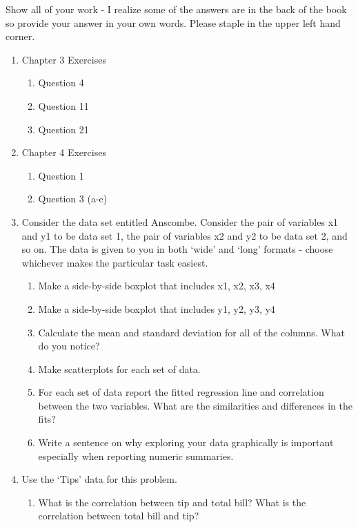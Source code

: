 \documentclass[10pt]{article}
\begin{document}
\pagestyle{fancy}
Show all of your work - I realize some of the answers are in the back of the book so provide your answer in your own words. Please staple in the upper left hand corner.

\begin{enumerate}


\item Chapter 3 Exercises
    \begin{enumerate}
        \item Question 4
        \item Question 11
        \item Question 21
    \end{enumerate}
\item Chapter 4 Exercises
    \begin{enumerate}
        \item Question 1
        \item Question 3 (a-e)
    \end{enumerate}
\item Consider the data set entitled Anscombe. Consider the pair of variables x1 and y1 to be data set 1, the pair of variables x2 and y2 to be data set 2, and so on.  The data is given to you in both `wide' and `long' formats - choose whichever makes the particular task easiest.
    \begin{enumerate}
        \item Make a side-by-side boxplot that includes x1, x2, x3, x4
        \item Make a side-by-side boxplot that includes y1, y2, y3, y4
        \item Calculate the mean and standard deviation for all of the columns.  What do you notice?
        \item Make scatterplots for each set of data.
        \item For each set of data report the fitted regression line and correlation between the two variables.  What are the similarities and differences in the fits?
        \item Write a sentence on why exploring your data graphically is important especially when reporting numeric summaries.
    \end{enumerate}
\item Use the `Tips' data for this problem.
    \begin{enumerate}
        \item What is the correlation between tip and total bill? What is the correlation between total bill and tip?

\end{enumerate}
\end{enumerate}
\end{document}
